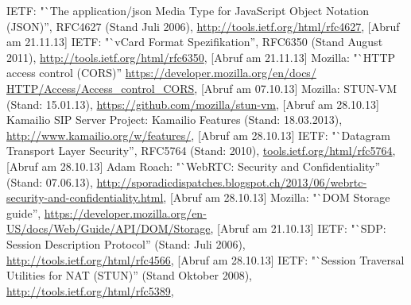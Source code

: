




%
%


\begin{thebibliography}{literatur}
	 IETF: 
		"`The application/json Media Type for JavaScript Object Notation (JSON)'', RFC4627 (Stand Juli 2006),
		\hyperlink{http://tools.ietf.org/html/rfc4627}{http://tools.ietf.org/html/rfc4627}, 
		[Abruf am 21.11.13]
	 IETF: 
		"`vCard Format Spezifikation'', RFC6350 (Stand August 2011),
		\hyperlink{http://tools.ietf.org/html/rfc6350}{http://tools.ietf.org/html/rfc6350}, 
		[Abruf am 21.11.13]
	 Mozilla: 
		"`HTTP access control (CORS)'' 
		\hyperlink{https://developer.mozilla.org/en/docs/HTTP/Access_control_CORS}{https://developer.mozilla.org/en/docs/
		HTTP/Access/Access\_control\_CORS}, 
		[Abruf am 07.10.13]
	 Mozilla: 
		STUN-VM (Stand: 15.01.13), 
		\hyperlink{https://github.com/mozilla/stun-vm}{https://github.com/mozilla/stun-vm},
		[Abruf am 28.10.13]
	 Kamailio SIP Server Project: 
		Kamailio Features (Stand: 18.03.2013), 
		\hyperlink{http://www.kamailio.org/w/features/}{http://www.kamailio.org/w/features/}, 
		[Abruf am 28.10.13]
	 IETF: 
		"`Datagram Transport Layer Security'', RFC5764 (Stand: 2010), 
		\hyperlink{http://tools.ietf.org/html/rfc5764}{tools.ietf.org/html/rfc5764}, 
		[Abruf am 28.10.13]
	 Adam Roach: 
		"`WebRTC: Security and Confidentiality'' (Stand: 07.06.13), 
		\hyperlink{http://sporadicdispatches.blogspot.ch/2013/06/webrtc-security-and-confidentiality.html}{http://sporadicdispatches.blogspot.ch/2013/06/webrtc-security-and-confidentiality.html}, 
		[Abruf am 28.10.13]
	 Mozilla: 
		"`DOM Storage guide'',
		\hyperlink{https://developer.mozilla.org/en-US/docs/Web/Guide/API/DOM/Storage}{https://developer.mozilla.org/en-US/docs/Web/Guide/API/DOM/Storage},
		[Abruf am 21.10.13]
	 IETF:
		"`SDP: Session Description Protocol'' (Stand: Juli 2006),
		\hyperlink{http://tools.ietf.org/html/rfc4566}{http://tools.ietf.org/html/rfc4566},
		[Abruf am 28.10.13]
	 IETF:
		"`Session Traversal Utilities for NAT (STUN)'' (Stand Oktober 2008),
		\hyperlink{http://tools.ietf.org/html/rfc5389}{http://tools.ietf.org/html/rfc5389},

\end{thebibliography}
